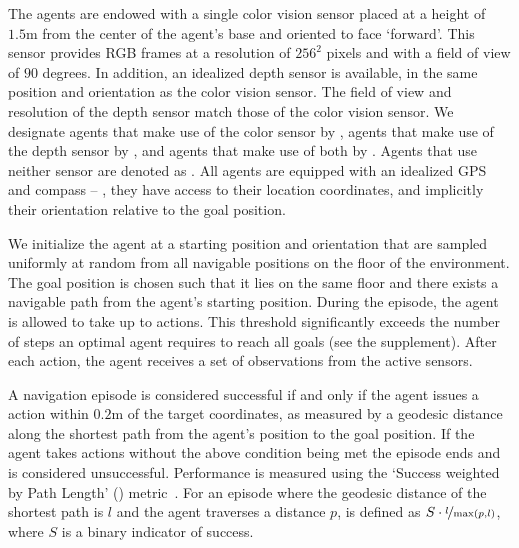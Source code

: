 The agents are endowed with a single color vision sensor placed at a height of $1.5\text{m}$ from the center of the agent's base and oriented to face `forward'.
This sensor provides RGB frames at a resolution of $256^2$ pixels 
and with a field of view of $90$ degrees.
In addition, an idealized depth sensor is available, in the same position and orientation as the color vision sensor.
The field of view and resolution of the depth sensor 
match those of the color vision sensor.
We designate agents that make use of the color sensor by \rgb, 
agents that make use of the depth sensor by \depth, 
and agents that make use of both by \rgbd.
Agents that use neither sensor are denoted as \blind.
All agents are equipped with an idealized GPS and compass 
-- \ie, they have access to their location coordinates, and 
implicitly their orientation relative to the goal position.

We initialize the agent at a starting position and 
orientation that are sampled uniformly at random from all 
navigable positions on the floor of the environment. 
The goal position is chosen such that it lies on the 
same floor and there exists a navigable path from the 
agent's starting position. 
During the episode, the agent is allowed to take up to 
\maxsteps actions.
This threshold significantly exceeds the number of steps an optimal agent requires to reach all goals (see the supplement).
After each action, the agent receives a set of 
observations from the active sensors. 

A navigation episode is considered successful if and only if the agent issues a \callstop action within $0.2\text{m}$ of the target coordinates, as measured by a geodesic distance along the shortest path from the agent's position to the goal position.
If the agent takes \maxsteps actions without the above condition being met the episode ends and is considered unsuccessful.
Performance is measured using the `Success weighted by Path Length' (\spl) metric~\cite{Anderson2018-Evaluation}.
For an episode where the geodesic distance of the 
shortest path is $l$ and the agent traverses a distance $p$, 
\spl is defined as $S \cdot \nicefrac{l}{\max(p,l)}$, where $S$ is a binary indicator of success.

